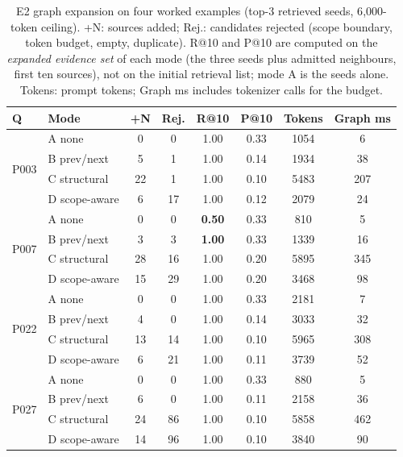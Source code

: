 \documentclass[runningheads]{llncs}
\begin{document}
\begin{table}[!htbp]
\centering\scriptsize
\caption{E2 graph expansion on four worked examples (top-3 retrieved seeds, 6{,}000-token ceiling). +N: sources added; Rej.: candidates rejected (scope boundary, token budget, empty, duplicate). R@10 and P@10 are computed on the \emph{expanded evidence set} of each mode (the three seeds plus admitted neighbours, first ten sources), not on the initial retrieval list; mode A is the seeds alone. Tokens: prompt tokens; Graph ms includes tokenizer calls for the budget.}
\label{tab:e2}
\setlength{\tabcolsep}{4pt}
\begin{tabular}{@{}llcccccc@{}}
\toprule
Q & Mode & +N & Rej. & R@10 & P@10 & Tokens & Graph ms \\
\midrule
\multirow{4}{*}{P003} & A none & 0 & 0 & 1.00 & 0.33 & 1054 & 6 \\
 & B prev/next & 5 & 1 & 1.00 & 0.14 & 1934 & 38 \\
 & C structural & 22 & 1 & 1.00 & 0.10 & 5483 & 207 \\
 & D scope-aware & 6 & 17 & 1.00 & 0.12 & 2079 & 24 \\
\midrule
\multirow{4}{*}{P007} & A none & 0 & 0 & \textbf{0.50} & 0.33 & 810 & 5 \\
 & B prev/next & 3 & 3 & \textbf{1.00} & 0.33 & 1339 & 16 \\
 & C structural & 28 & 16 & 1.00 & 0.20 & 5895 & 345 \\
 & D scope-aware & 15 & 29 & 1.00 & 0.20 & 3468 & 98 \\
\midrule
\multirow{4}{*}{P022} & A none & 0 & 0 & 1.00 & 0.33 & 2181 & 7 \\
 & B prev/next & 4 & 0 & 1.00 & 0.14 & 3033 & 32 \\
 & C structural & 13 & 14 & 1.00 & 0.10 & 5965 & 308 \\
 & D scope-aware & 6 & 21 & 1.00 & 0.11 & 3739 & 52 \\
\midrule
\multirow{4}{*}{P027} & A none & 0 & 0 & 1.00 & 0.33 & 880 & 5 \\
 & B prev/next & 6 & 0 & 1.00 & 0.11 & 2158 & 36 \\
 & C structural & 24 & 86 & 1.00 & 0.10 & 5858 & 462 \\
 & D scope-aware & 14 & 96 & 1.00 & 0.10 & 3840 & 90 \\
\bottomrule
\end{tabular}
\end{table}
\end{document}

